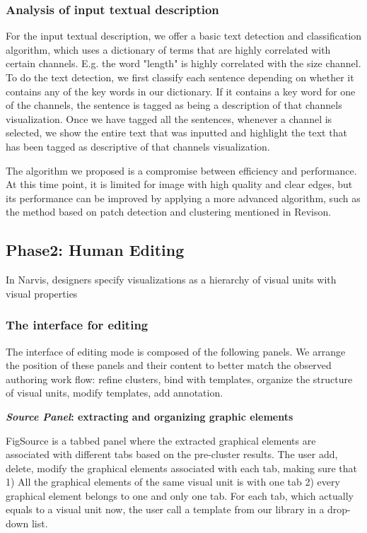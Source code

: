 \subsubsection{Analysis of input textual description}
For the input textual description, we offer a basic text detection and classification algorithm, which uses a dictionary of terms that are highly correlated with certain channels. E.g. the word "length" is highly correlated with the size channel. To do the text detection, we first classify each sentence depending on whether it contains any of the key words in our dictionary. If it contains a key word for one of the channels, the sentence is tagged as being a description of that channels visualization. Once we have tagged all the sentences, whenever a channel is selected, we show the entire text that was inputted and highlight the text that has been tagged as descriptive of that channels visualization.

The algorithm we proposed is a compromise between efficiency and performance. At this time point, it is limited for image with high quality and clear edges, but its performance can be improved by applying a more advanced algorithm, such as the method based on patch detection and clustering mentioned in Revison\cite{savva_revision:_2011}.

\subsection{Phase2: Human Editing}
In Narvis, designers specify visualizations as a hierarchy of visual units with visual properties
\subsubsection{The interface for editing}
The interface of editing mode is composed of the following panels. We arrange the position of these panels and their content to better match the observed authoring work flow: refine clusters, bind with templates, organize the structure of visual units, modify templates, add annotation. 

\textbf{\textit{Source Panel}: extracting and organizing graphic elements}\par
FigSource is a tabbed panel where the extracted graphical elements are associated with different tabs based on the pre-cluster results. The user add, delete, modify the graphical elements associated with each tab, making sure that 1) All the graphical elements of the same visual unit is with one tab 2) every graphical element belongs to one and only one tab. For each tab, which actually equals to a visual unit now, the user call a template from our library in a drop-down list. 

